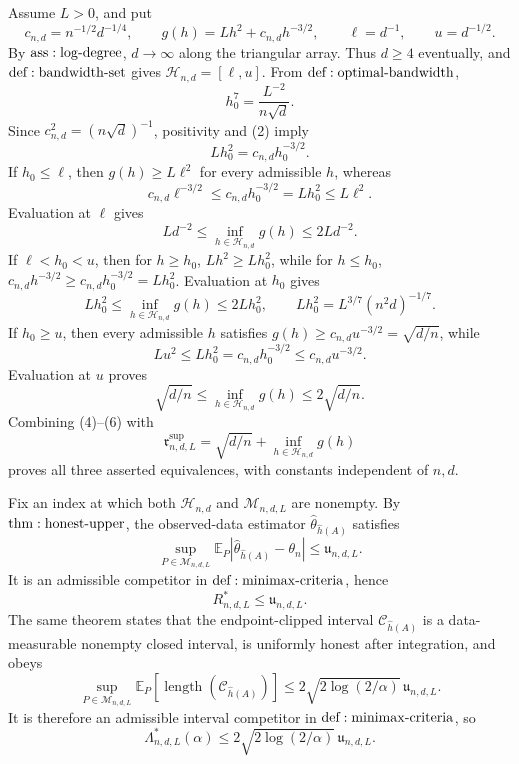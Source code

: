 Assume \(L>0\), and put
\[
 c_{n,d}=n^{-1/2}d^{-1/4},\qquad
 g(h)=Lh^2+c_{n,d}h^{-3/2},\qquad
 \ell=d^{-1},\qquad u=d^{-1/2}.
\tag{1}
\]
By \({\rm ass:log\text{-}degree}\), \(d\to\infty\) along the triangular array.  Thus \(d\geq4\) eventually, and \({\rm def:bandwidth\text{-}set}\) gives \(\mathcal H_{n,d}=[\ell,u]\).  From \({\rm def:optimal\text{-}bandwidth}\),
\[
 h_0^7=\frac{L^{-2}}{n\sqrt d}.
\tag{2}
\]
Since \(c_{n,d}^2=(n\sqrt d)^{-1}\), positivity and (2) imply
\[
 Lh_0^2=c_{n,d}h_0^{-3/2}.
\tag{3}
\]
If \(h_0\leq\ell\), then \(g(h)\geq L\ell^2\) for every admissible \(h\), whereas
\[
 c_{n,d}\ell^{-3/2}
 \leq c_{n,d}h_0^{-3/2}
 =Lh_0^2\leq L\ell^2.
\]
Evaluation at \(\ell\) gives
\[
 Ld^{-2}\leq\inf_{h\in\mathcal H_{n,d}}g(h)\leq2Ld^{-2}.
\tag{4}
\]
If \(\ell<h_0<u\), then for \(h\geq h_0\), \(Lh^2\geq Lh_0^2\), while for \(h\leq h_0\), \(c_{n,d}h^{-3/2}\geq c_{n,d}h_0^{-3/2}=Lh_0^2\).  Evaluation at \(h_0\) gives
\[
 Lh_0^2\leq\inf_{h\in\mathcal H_{n,d}}g(h)\leq2Lh_0^2,
 \qquad
 Lh_0^2=L^{3/7}(n^2d)^{-1/7}.
\tag{5}
\]
If \(h_0\geq u\), then every admissible \(h\) satisfies \(g(h)\geq c_{n,d}u^{-3/2}=\sqrt{d/n}\), while
\[
 Lu^2\leq Lh_0^2=c_{n,d}h_0^{-3/2}
 \leq c_{n,d}u^{-3/2}.
\]
Evaluation at \(u\) proves
\[
 \sqrt{d/n}\leq\inf_{h\in\mathcal H_{n,d}}g(h)
 \leq2\sqrt{d/n}.
\tag{6}
\]
Combining (4)--(6) with
\[
 \mathfrak r^{\mathrm{sup}}_{n,d,L}
 =\sqrt{d/n}+\inf_{h\in\mathcal H_{n,d}}g(h)
\tag{7}
\]
proves all three asserted equivalences, with constants independent of \(n,d\).

Fix an index at which both \(\mathcal H_{n,d}\) and \(\mathcal M_{n,d,L}\) are nonempty.  By \({\rm thm:honest\text{-}upper}\), the observed-data estimator \(\widehat\theta_{\widehat h(A)}\) satisfies
\[
 \sup_{P\in\mathcal M_{n,d,L}}
 \mathbb E_P|\widehat\theta_{\widehat h(A)}-\theta_n|
 \leq\mathfrak u_{n,d,L}.
\tag{8}
\]
It is an admissible competitor in \({\rm def:minimax\text{-}criteria}\), hence
\[
 R^*_{n,d,L}\leq\mathfrak u_{n,d,L}.
\tag{9}
\]
The same theorem states that the endpoint-clipped interval \(\mathcal C_{\widehat h(A)}\) is a data-measurable nonempty closed interval, is uniformly honest after integration, and obeys
\[
 \sup_{P\in\mathcal M_{n,d,L}}
 \mathbb E_P[\operatorname{length}(\mathcal C_{\widehat h(A)})]
 \leq2\sqrt{2\log(2/\alpha)}\,\mathfrak u_{n,d,L}.
\tag{10}
\]
It is therefore an admissible interval competitor in \({\rm def:minimax\text{-}criteria}\), so
\[
 \Lambda^*_{n,d,L}(\alpha)
 \leq2\sqrt{2\log(2/\alpha)}\,\mathfrak u_{n,d,L}.
\tag{11}
\]

